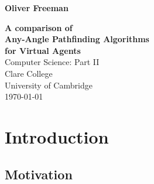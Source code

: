 \documentclass[12pt,notitlepage]{report}
\begin{document}


\pagestyle{empty}

\hfill{\LARGE \bf Oliver Freeman}

\vspace*{60mm}
\begin{center}
\Huge
{\bf A comparison of \\Any-Angle Pathfinding Algorithms \\for Virtual Agents} \\
\vspace*{5mm}
Computer Science: Part II \\
\vspace*{5mm}
Clare College \\
University of Cambridge\\
\vspace*{5mm}
\today  %
\end{center}

\cleardoublepage


\setcounter{page}{1}
\pagestyle{plain}



\cleardoublepage

\tableofcontents

\listoffigures

\listoftables

\listofalgorithms




\cleardoublepage        %

\setcounter{page}{1}
\pagestyle{headings}

\chapter{Introduction}

\section{Motivation}
\end{document}
